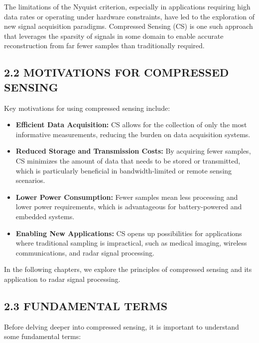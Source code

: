 \documentclass[
  letterpaper,
  DIV=11,
  numbers=noendperiod]{scrartcl}
\providecommand{\tightlist}{%
  \setlength{\itemsep}{0pt}\setlength{\parskip}{0pt}}
\begin{document}
The limitations of the Nyquist criterion, especially in applications
requiring high data rates or operating under hardware constraints, have
led to the exploration of new signal acquisition paradigms. Compressed
Sensing (CS) is one such approach that leverages the sparsity of signals
in some domain to enable accurate reconstruction from far fewer samples
than traditionally required.

\subsection{2.2 MOTIVATIONS FOR COMPRESSED
SENSING}\label{motivations-for-compressed-sensing}

Key motivations for using compressed sensing include:

\begin{itemize}
\tightlist
\item
  \textbf{Efficient Data Acquisition:} CS allows for the collection of
  only the most informative measurements, reducing the burden on data
  acquisition systems.
\item
  \textbf{Reduced Storage and Transmission Costs:} By acquiring fewer
  samples, CS minimizes the amount of data that needs to be stored or
  transmitted, which is particularly beneficial in bandwidth-limited or
  remote sensing scenarios.
\item
  \textbf{Lower Power Consumption:} Fewer samples mean less processing
  and lower power requirements, which is advantageous for
  battery-powered and embedded systems.
\item
  \textbf{Enabling New Applications:} CS opens up possibilities for
  applications where traditional sampling is impractical, such as
  medical imaging, wireless communications, and radar signal processing.
\end{itemize}

In the following chapters, we explore the principles of compressed
sensing and its application to radar signal processing.

\subsection{2.3 FUNDAMENTAL TERMS}\label{fundamental-terms}

Before delving deeper into compressed sensing, it is important to
understand some fundamental terms:
\end{document}
